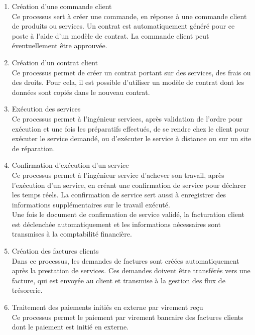 \begin{enumerate}
\item Création d’une commande client \\
Ce processus sert à créer une commande, en réponse à une commande client de produits ou services. Un contrat est automatiquement généré pour ce poste à l’aide d’un modèle de contrat. La commande client peut éventuellement être approuvée. \\

\item Création d’un contrat client \\
Ce processus permet de créer un contrat portant sur des services, des frais ou des droits. Pour cela, il est possible d’utiliser un modèle de contrat dont les données sont copiés dans le nouveau contrat.\\

\item Exécution des services \\
Ce processus permet à l’ingénieur services, après validation de l’ordre pour exécution et une fois les préparatifs effectués, de se rendre chez le client pour exécuter le service demandé, ou d’exécuter le service à distance ou sur un site de réparation. \\

\item Confirmation d'exécution d’un service \\
Ce processus permet à l’ingénieur service d’achever son travail, après l’exécution d’un service, en créant une confirmation de service pour déclarer les temps réels. La confirmation de service sert aussi à enregistrer des informations supplémentaires sur le travail exécuté. \\

Une fois le document de confirmation de service validé, la facturation client est déclenchée automatiquement et les informations nécessaires sont transmises à la comptabilité financière. \\

\item Création des factures clients \\
Dans ce processus, les demandes de factures sont créées automatiquement après la prestation de services. Ces demandes doivent être transférés vers une facture, qui est envoyée au client et transmise à la gestion des flux de trésorerie. \\

\item Traitement des paiements initiés en externe par virement reçu \\
Ce processus permet le paiement par virement bancaire des factures clients dont le paiement est initié en externe.
\end{enumerate}

